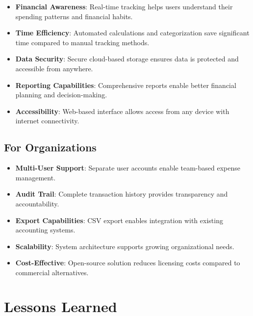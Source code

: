 \begin{itemize}
    \item \textbf{Financial Awareness}: Real-time tracking helps users understand their spending patterns and financial habits.
    
    \item \textbf{Time Efficiency}: Automated calculations and categorization save significant time compared to manual tracking methods.
    
    \item \textbf{Data Security}: Secure cloud-based storage ensures data is protected and accessible from anywhere.
    
    \item \textbf{Reporting Capabilities}: Comprehensive reports enable better financial planning and decision-making.
    
    \item \textbf{Accessibility}: Web-based interface allows access from any device with internet connectivity.
\end{itemize}

\subsection{For Organizations}

\begin{itemize}
    \item \textbf{Multi-User Support}: Separate user accounts enable team-based expense management.
    
    \item \textbf{Audit Trail}: Complete transaction history provides transparency and accountability.
    
    \item \textbf{Export Capabilities}: CSV export enables integration with existing accounting systems.
    
    \item \textbf{Scalability}: System architecture supports growing organizational needs.
    
    \item \textbf{Cost-Effective}: Open-source solution reduces licensing costs compared to commercial alternatives.
\end{itemize}

\section{Lessons Learned}

